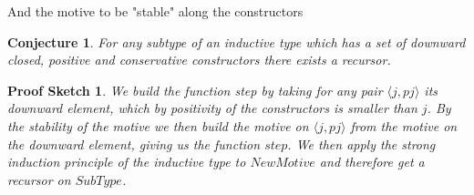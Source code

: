 \documentclass{article}
\newtheorem{conjecture}{Conjecture}
\newtheorem{sketch}{Proof Sketch}
\begin{document}
And the motive to be "stable" along the constructors

\begin{conjecture}
    For any subtype of an inductive type which has a set of downward closed, positive and conservative constructors there exists a recursor.
\end{conjecture}

\begin{sketch}
    We build the function step by taking for any pair $\langle j , pj \rangle$ its downward element, which by positivity of the constructors is smaller than $j$.
    By the stability of the motive we then build the motive on $\langle j , pj \rangle$ from the motive on the downward element, giving us the function $step$.
    We then apply the strong induction principle of the inductive type to $NewMotive$ and therefore get a recursor on $SubType$.
\end{sketch}
\end{document}

